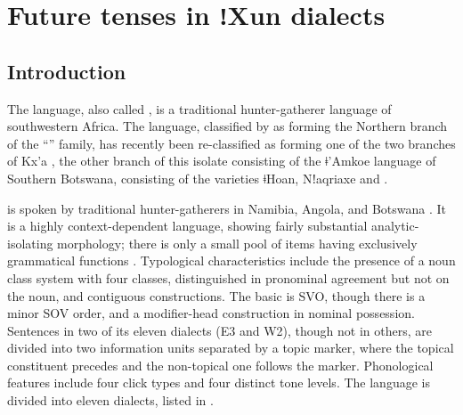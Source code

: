 \documentclass[output=paper]{langsci/langscibook}
\begin{document}
\section{Future tenses in ⁠ǃ⁠Xun dialects}\label{sec:heine:2} 
\subsection{Introduction}


The  language, also called , is a traditional hunter-gatherer language of southwestern Africa. The language, classified by \citet{Greenberg1963} as forming the Northern branch of the “” family, has recently been re-classified as forming one of the two branches of Kx'a  \citep{Heine2010}, the other branch of this isolate consisting of the ǂ’Amkoe language of Southern Botswana, consisting of the varieties ǂHoan, N⁠ǃ⁠aqriaxe and  \citep{Güldemann2014}.


   is spoken by traditional hunter-gatherers in Namibia, Angola, and Botswana \citep{HeineKönigForthc}. It is a highly context-dependent language, showing fairly substantial analytic-isolating morphology; there is only a small pool of items having exclusively grammatical functions \citep{HeineKönig2005}. Typological characteristics include the presence of a noun class system with four classes, distinguished in pronominal agreement but not on the noun, and contiguous  constructions.   The basic  is SVO, though there is a minor SOV order, and a modifier-head construction in nominal possession. Sentences in two of its eleven dialects (E3 and W2), though not in others, are divided into two information units separated by a topic marker, where the topical constituent precedes and the non-topical one follows the marker. Phonological features include four click types and four distinct tone levels. The language is divided into eleven dialects, listed in .
\end{document}

